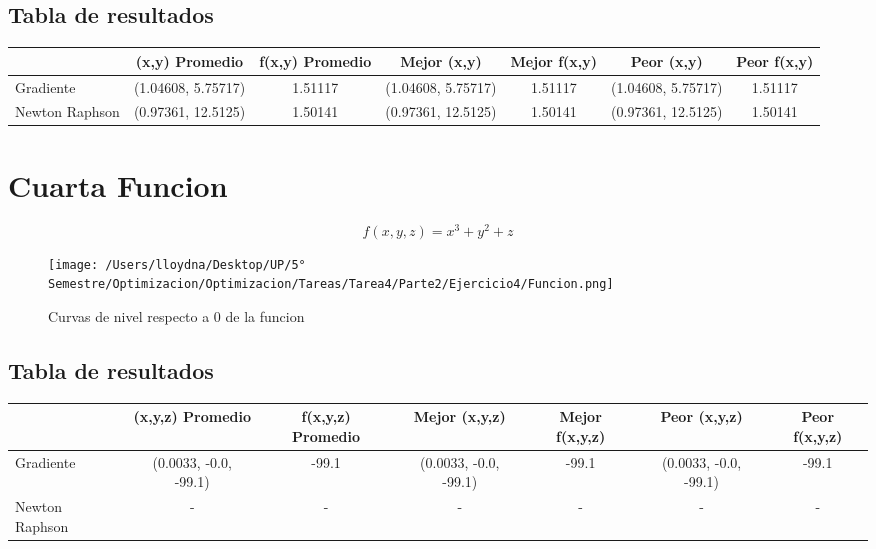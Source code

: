 \documentclass{report}
\begin{document}
            \subsection{Tabla de resultados}
            \begin{tabular}{l|c|c|c|c|c|c}
                & (x,y) Promedio & f(x,y) Promedio & Mejor (x,y) & Mejor f(x,y) & Peor (x,y) & Peor f(x,y)\\
                \hline
                Gradiente & (1.04608, 5.75717) & 1.51117 & (1.04608, 5.75717) & 1.51117 & (1.04608, 5.75717) & 1.51117\\
                \hline
                Newton Raphson & (0.97361, 12.5125) & 1.50141 & (0.97361, 12.5125) & 1.50141 & (0.97361, 12.5125) & 1.50141\\
                \hline
            \end{tabular}
        \pagebreak 

        \section{Cuarta Funcion}
            \begin{equation*}
                f(x,y,z)=x^3+y^2+z
            \end{equation*}

            \begin{figure}[H]
                \texttt{[image: /Users/lloydna/Desktop/UP/5° Semestre/Optimizacion/Optimizacion/Tareas/Tarea4/Parte2/Ejercicio4/Funcion.png]}
                \caption{Curvas de nivel respecto a 0 de la funcion}
                \label{fig:fun15}
            \end{figure}

            \subsection{Tabla de resultados}
            \begin{tabular}{l|c|c|c|c|c|c}
                & (x,y,z) Promedio & f(x,y,z) Promedio & Mejor (x,y,z) & Mejor f(x,y,z) & Peor (x,y,z) & Peor f(x,y,z)\\
                \hline
                Gradiente & (0.0033, -0.0, -99.1) & -99.1 & (0.0033, -0.0, -99.1) & -99.1 & (0.0033, -0.0, -99.1) & -99.1\\
                \hline
                Newton Raphson & - & - & - & - & - & - \\
                \hline
            \end{tabular}
        \pagebreak
\end{document}
